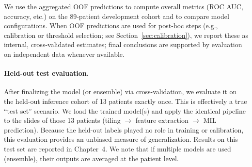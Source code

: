 We use the aggregated OOF predictions to compute overall metrics (ROC AUC, accuracy, etc.) on the 89-patient development cohort and to compare model configurations. When OOF predictions are used for post-hoc steps (e.g., calibration or threshold selection; see Section~\ref{sec:calibration}), we report these as internal, cross-validated estimates; final conclusions are supported by evaluation on independent data whenever available.

\paragraph{Held-out test evaluation.}
After finalizing the model (or ensemble) via cross-validation, we evaluate it on the held-out inference cohort of 13 patients exactly once. This is effectively a true “test set” scenario. We load the trained model(s) and apply the identical pipeline to the slides of those 13 patients (tiling $\to$ feature extraction $\to$ MIL prediction). Because the held-out labels played no role in training or calibration, this evaluation provides an unbiased measure of generalization. Results on this test set are reported in Chapter~4. We note that if multiple models are used (ensemble), their outputs are averaged at the patient level.

